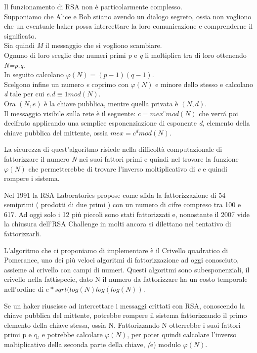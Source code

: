 Il funzionamento di RSA non è particolarmente complesso. \\
Supponiamo che Alice e Bob stiano avendo un dialogo segreto, ossia non vogliono che un eventuale haker possa intercettare la loro comunicazione e comprenderne il significato. \\
Sia quindi \emph{M} il messaggio che si vogliono scambiare.  \\
Ognuno di loro sceglie due numeri primi \emph{p} e \emph{q} li moltiplica tra di loro ottenendo \emph{N=p.q}. \\
In seguito calcolano $\varphi( N)  = ( p-1)(q-1)$. \\
Scelgono infine un numero \emph{e} coprimo con $\varphi(N)$ e minore dello stesso e calcolano \emph{d} tale per cui $e.d\equiv 1 mod(N)$. \\
Ora $(N, e)$ è la chiave pubblica, mentre quella privata è $(N, d)$. \\
Il messaggio visibile sulla rete è il seguente: $c=mex^e mod(N)$ che verr\'{a} poi decifrato applicando una semplice esponenziazione di esponente \emph{d}, elemento della chiave pubblica del mittente, ossia $mex=c^d mod(N)$.

La sicurezza di quest'algoritmo risiede nella difficoltà computazionale di fattorizzare il numero \emph{N} nei suoi fattori primi e quindi nel trovare la funzione $\varphi(N)$
che permetterebbe di trovare l'inverso moltiplicativo di \emph{e} e quindi rompere i sistema.

Nel 1991 la RSA Laboratories propose come sfida la fattorizzazione di 54 semiprimi ( prodotti di due primi ) con un numero di cifre compreso tra 100 e 617.
Ad oggi solo i 12 pi\'{u} piccoli sono stati fattorizzati e, nonostante il 2007 vide la chiusura dell'RSA Challenge in molti ancora si dilettano nel tentativo di fattorizzarli.

L'algoritmo che ci proponiamo di implementare è il Crivello quadratico di Pomerance, uno dei più veloci algoritmi di fattorizzazione ad oggi conosciuto, assieme al crivello con campi di numeri.
Questi algoritmi sono subesponenziali, il crivello nella fattispecie, dato N il numero da fattorizzare ha un costo temporale nell'ordine di $e*sqrt(log(N)log(log(N))$.

Se un haker riuscisse ad intercettare i messaggi crittati con RSA, conoscendo la chiave pubblica del mittente,
potrebbe rompere il sistema fattorizzando il primo elemento della chiave stessa, ossia N.
Fattorizzando N otterrebbe i suoi fattori primi p e q, e potrebbe calcolare $\varphi(N)$, per poter quindi calcolare l'inverso moltiplicativo della seconda parte della chiave, \emph(e) modulo $\varphi(N)$.
